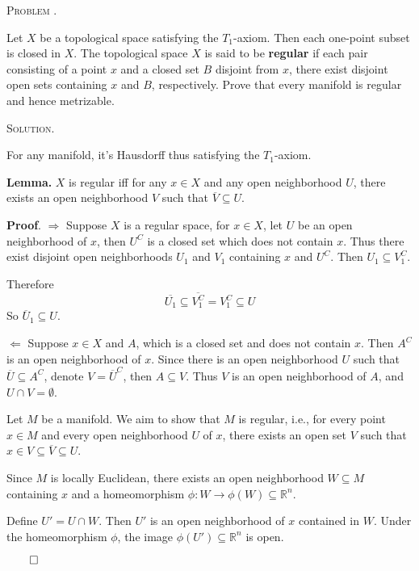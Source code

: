 \documentclass[12pt, a4paper, oneside]{ctexart}
\newcounter{problemname}
\newenvironment{problem}{\begin{framed}\stepcounter{problemname}\par\noindent\textsc{Problem \arabic{problemname}. }}{\end{framed}\par}
\newenvironment{solution}{%
	\par\noindent\textsc{Solution. }\ignorespaces
}{%
	\hfill$\qed$\par
}
\begin{document}
	\begin{problem}
		
		Let \( X \) be a topological space satisfying the \( T_1 \)-axiom.
        Then each one-point subset is closed in \( X \). The topological space \( X \) is said to be \textbf{regular} 
        if each pair consisting of a point \( x \) and a closed set \( B \) disjoint from \( x \), 
        there exist disjoint open sets containing \( x \) and \( B \), respectively. 
        Prove that every manifold is regular and hence metrizable.
	

	\end{problem}
	
	\begin{solution}
		
		For any manifold, it's Hausdorff thus satisfying the $T_1$-axiom.

		\textbf{Lemma.} $X$ is regular iff for any $x\in X$ and any open neighborhood $U$, there exists an open
		neighborhood $V$ such that $\overline{V}\subseteq U$.

		\textbf{Proof}. $\Rightarrow$ Suppose $X$ is a regular space, for $x\in X$, let $U$ be an open neighborhood of 
		$x$, then $U^C$ is a closed set which does not contain $x$. Thus there exist disjoint open neighborhoods $U_1$ and
		$V_1$ containing $x$ and $U^C$. Then $U_1\subseteq V_1^C$.

		Therefore \[\overline{U_1} \subseteq \overline{V_1^C} = V_1^C \subseteq U\]
		So $\overline{U}_1\subseteq U$.

		$\Leftarrow$ Suppose $x\in X$ and $A$, which is a closed set and does not contain $x$.
		Then $A^C$ is an open neighborhood of $x$. Since there is an open neighborhood $U$
		such that $\overline{U}\subseteq A^C$, denote $V = \overline{U}^C$, then $A\subseteq V$.
		Thus $V$ is an open neighborhood of $A$, and $U \cap V = \emptyset$.
		
		Let \( M \) be a manifold. We aim to show that \( M \) is regular, i.e., for every point \( x \in M \) and every open neighborhood \( U \) of \( x \), there exists an open set \( V \) such that \( x \in V \subseteq \overline{V} \subseteq U \). 


    	Since \( M \) is locally Euclidean, there exists an open neighborhood \( W \subseteq M \) containing \( x \) and a homeomorphism \( \phi: W \to \phi(W) \subseteq \mathbb{R}^n \).

    Define \( U' = U \cap W \). Then \( U' \) is an open neighborhood of \( x \) contained in \( W \). Under the homeomorphism \( \phi \), the image \( \phi(U') \subseteq \mathbb{R}^n \) is open.


\end{solution}
\end{document}
